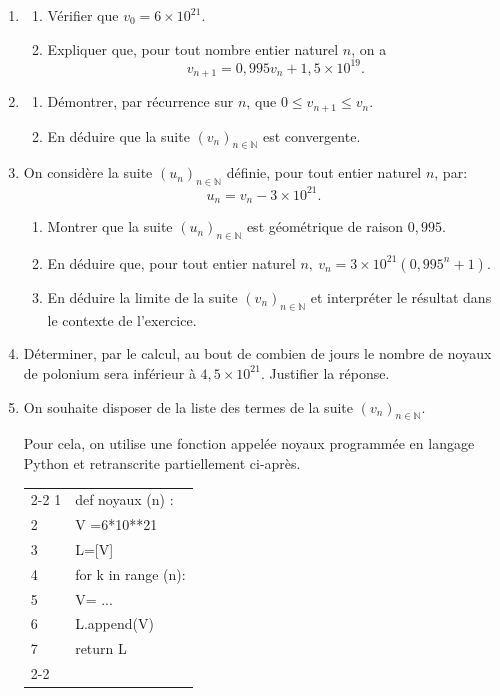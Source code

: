 \documentclass[10pt]{article}
\providecommand{\N}{\mathbb{N}}
\begin{document}
\begin{enumerate}
\item 
	\begin{enumerate}
		\item Vérifier que $v_0 = 6\times 10^{21}$.
		\item Expliquer que, pour tout nombre entier naturel $n$, on a 
		\[v_{n+1} = 0,995v_n + 1,5 \times  10^{19}.\]
	\end{enumerate}
\item 
	\begin{enumerate}
		\item Démontrer, par récurrence sur $n$, que $0 \leqslant v_{n+1}  \leqslant v_n$.
		\item En déduire que la suite $\left(v_n\right)_{n\in \N}$ est convergente.
	\end{enumerate}
\item On considère la suite $\left(u_n\right)_{n \in \N}$ définie, pour tout entier naturel $n$, par: \[u_n = v_n - 3 \times 10^{21}.\]
	\begin{enumerate}
		\item Montrer que la suite $\left(u_n\right)_{n \in \N}$ est géométrique de raison $0,995$.
		\item En déduire que, pour tout entier naturel $n,\: v_n = 3 \times 10^{21}\left(0,995^n + 1\right)$.
		\item En déduire la limite de la suite $\left(v_n\right)_{n \in \N}$ et interpréter le résultat dans le contexte de l'exercice.
	\end{enumerate}
\item Déterminer, par le calcul, au bout de combien de jours le nombre de noyaux de polonium sera inférieur à $4,5 \times 10^{21}$. Justifier la réponse.
\item On souhaite disposer de la liste des termes de la suite $\left(v_n\right)_{n \in \N}$. 

Pour cela, on utilise une fonction appelée noyaux programmée en langage Python et retranscrite partiellement ci-après.

\begin{center}
\begin{tabular}{l |l|}\cline{2-2}
1 &def noyaux (n) :\\
2 &\qquad V =6*10**21\\
3&\qquad L=[V]\\
4&\qquad for k in range (n):\\
5&\qquad \qquad V= ...\\
6&\qquad \qquad L.append(V)\\
7&\qquad return L\\ \cline{2-2}
\end{tabular}
\end{center}


\end{enumerate}
\end{document}
